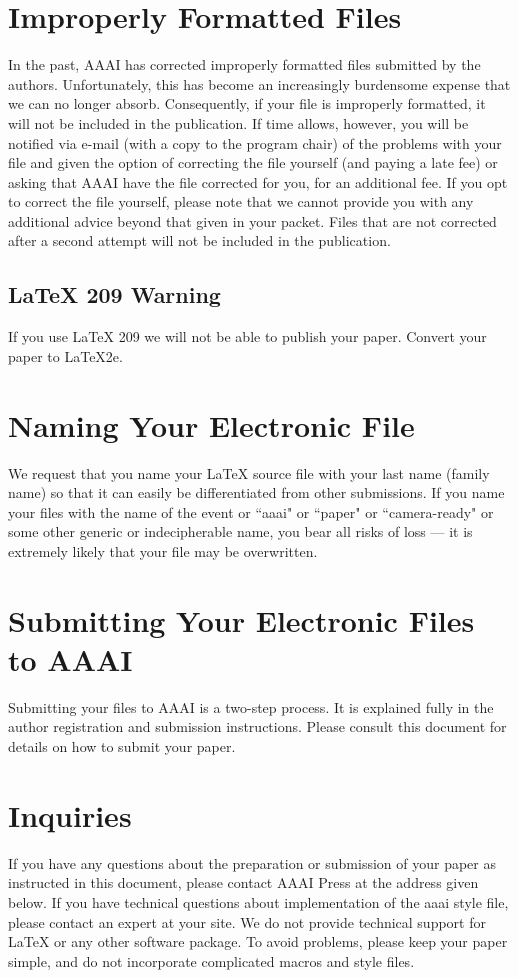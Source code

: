 \documentclass[letterpaper]{article}
\begin{document}
\section{Improperly Formatted Files }
In the past, AAAI has corrected improperly formatted files submitted by the authors. Unfortunately, this has become an increasingly burdensome expense that we can no longer absorb. Consequently, if your file is improperly formatted, it will not be included in the publication. If time allows, however, you will be notified via e-mail (with a copy to the program chair) of the problems with your file and given the option of correcting the file yourself (and paying a late fee) or asking that AAAI have the file corrected for you, for an additional fee. If you opt to correct the file yourself, please note that we cannot provide you with any additional advice beyond that given in your packet. Files that are not corrected after a second attempt will not be included in the publication.

\subsection{\LaTeX{} 209 Warning}
If you use \LaTeX{} 209 we will not be able to publish your paper. Convert your paper to \LaTeX{}2e.

\section{Naming Your Electronic File}
We request that you name your \LaTeX{} source file with your last name (family name) so that it can easily be differentiated from other submissions. If you name your files with the name of the event or ``aaai" or ``paper" or ``camera-ready" or some other generic or indecipherable name, you bear all risks of loss --- it is extremely likely that your file may be overwritten.

\section{Submitting Your Electronic Files to AAAI}
Submitting your files to AAAI is a two-step process. It is explained fully in the author registration and submission instructions. Please consult this document for details on how to submit your paper.

\section{Inquiries} 
If you have any questions about the preparation or submission of your paper as instructed in this document, please contact AAAI Press at the address given below. If you have technical questions about implementation of the aaai style file, please contact an expert at your site. We do not provide technical support for \LaTeX{} or any other software package. To avoid problems, please keep your paper simple, and do not incorporate complicated macros and style files.
\end{document}
